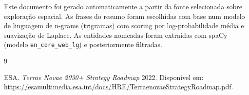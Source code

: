 \documentclass[12pt]{article}
\begin{document}
Este documento foi gerado automaticamente a partir da fonte selecionada sobre exploração espacial.
As frases do resumo foram escolhidas com base num modelo de linguagem de n-grams (trigramas) com scoring por log-probabilidade média e suavização de Laplace.
As entidades nomeadas foram extraídas com spaCy (modelo \texttt{en\_core\_web\_lg}) e posteriormente filtradas.

\begin{thebibliography}{9}

ESA. \textit{Terrae Novae 2030+ Strategy Roadmap} 2022. Disponível em: \url{https://esamultimedia.esa.int/docs/HRE/TerraenovaeStrategyRoadmap.pdf}.

\end{thebibliography}
\end{document}

